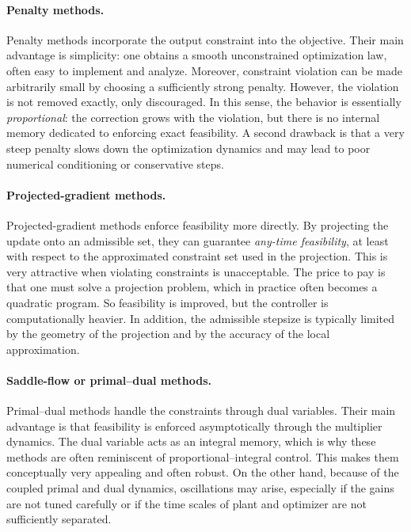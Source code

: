 \paragraph{Penalty methods.}
Penalty methods incorporate the output constraint into the objective. Their main advantage is simplicity: one obtains a smooth unconstrained optimization law, often easy to implement and analyze. Moreover, constraint violation can be made arbitrarily small by choosing a sufficiently strong penalty. However, the violation is not removed exactly, only discouraged. In this sense, the behavior is essentially \emph{proportional}: the correction grows with the violation, but there is no internal memory dedicated to enforcing exact feasibility. A second drawback is that a very steep penalty slows down the optimization dynamics and may lead to poor numerical conditioning or conservative steps.

\paragraph{Projected-gradient methods.}
Projected-gradient methods enforce feasibility more directly. By projecting the update onto an admissible set, they can guarantee \emph{any-time feasibility}, at least with respect to the approximated constraint set used in the projection. This is very attractive when violating constraints is unacceptable. The price to pay is that one must solve a projection problem, which in practice often becomes a quadratic program. So feasibility is improved, but the controller is computationally heavier. In addition, the admissible stepsize is typically limited by the geometry of the projection and by the accuracy of the local approximation.

\paragraph{Saddle-flow or primal--dual methods.}
Primal--dual methods handle the constraints through dual variables. Their main advantage is that feasibility is enforced asymptotically through the multiplier dynamics. The dual variable acts as an integral memory, which is why these methods are often reminiscent of proportional--integral control. This makes them conceptually very appealing and often robust. On the other hand, because of the coupled primal and dual dynamics, oscillations may arise, especially if the gains are not tuned carefully or if the time scales of plant and optimizer are not sufficiently separated.

